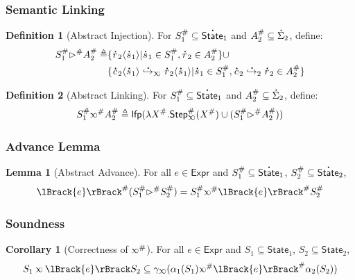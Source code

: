 \documentclass{beamer}
\theoremstyle{definition}
\newtheorem*{definition*}{Definition}
\newtheorem*{lemma*}{Lemma}
\newtheorem*{corollary*}{Corollary}
\newcommand*{\A}[1]{\overset{\,_{\mbox{\Large .}}}{#1}}
\newcommand*{\Abs}[1]{{#1}^{\#}}
\newcommand*{\Expr}{\mathsf{Expr}}
\newcommand*{\config}{c}
\newcommand*{\rightst}{r}
\newcommand*{\State}{\mathsf{State}}
\newcommand*{\lfp}{\mathsf{lfp}}
\newcommand*{\Step}{\mathsf{Step}}
\newcommand*{\semarrow}{\hookrightarrow}
\newcommand*{\semlink}{\mathbin{\rotatebox[origin=c]{180}{$\propto$}}}
\newcommand*{\sembracket}[1]{\lBrack{#1}\rBrack}
\newcommand*{\inject}[2]{{#2}\langle{#1}\rangle}
\begin{document}
\begin{frame}[c]
  \frametitle{Semantic Linking}
  \begin{definition*}[Abstract Injection]
    For $\Abs{S}_1\subseteq\A\State_1$ and $\Abs{A}_2\subseteq\A{\Sigma}_2$, define:
    \begin{align*}
      \Abs{S}_1\Abs\rhd\Abs{A}_2\triangleq & \{\inject{\A{s}_1}{\A\rightst_2}|\A{s}_1\in\Abs{S}_1,\A\rightst_2\in\Abs{A}_2\}\cup                                                                        \\
                                           & \{\inject{\A{s}_1}{\A\config_2}\A\semarrow_{\semlink}\inject{\A{s}_1}{\A\rightst_2}|\A{s}_1\in\Abs{S}_1,\A\config_2\A\semarrow_2\A\rightst_2\in\Abs{A}_2\}
    \end{align*}
  \end{definition*}
  \begin{definition*}[Abstract Linking]
    For $\Abs{S}_1\subseteq\A\State_1$ and $\Abs{A}_2\subseteq\A{\Sigma}_2$, define:
    \[
      \Abs{S}_1\Abs\semlink\Abs{A}_2\triangleq\lfp(\lambda\Abs{X}.\Abs\Step_{\semlink}(\Abs{X})\cup(\Abs{S}_1\Abs\rhd\Abs{A}_2))
    \]
  \end{definition*}
\end{frame}
\begin{frame}[c]
  \frametitle{Advance Lemma}
  \begin{lemma*}[Abstract Advance]\label{thm:absadvance}
    For all $e\in\Expr$ and $\Abs{S}_1\subseteq\A\State_1$, $\Abs{S}_2\subseteq\A\State_2$,
    \[
      \Abs{\sembracket{e}}(\Abs{S}_1\Abs\rhd\Abs{S}_2)=\Abs{S}_1\Abs\semlink\Abs{\sembracket{e}}\Abs{S}_2
    \]
  \end{lemma*}
\end{frame}
\begin{frame}[c]
  \frametitle{Soundness}
  \begin{corollary*}[Correctness of $\Abs{\semlink}$]
    For all $e\in\Expr$ and $S_1\subseteq\State_1$, $S_2\subseteq\State_2$,
    \[S_1\semlink\sembracket{e}S_2\subseteq\gamma_{\semlink}(\alpha_1(S_1)\Abs\semlink\Abs{\sembracket{e}}\alpha_2(S_2))\]
  \end{corollary*}
\end{frame}
\end{document}
